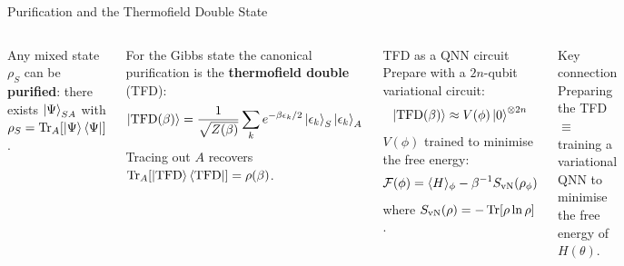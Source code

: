 \documentclass[aspectratio=169,10pt]{beamer}
\begin{document}
\begin{frame}{Purification and the Thermofield Double State}
  \begin{columns}[T]
      Any mixed state $\rho_S$ can be \textbf{purified}: there exists
      $\ket{\Psi}_{SA}$ with $\rho_S = \Tr_A[\ket{\Psi}\bra{\Psi}]$.

      For the Gibbs state the canonical purification is the
      \textbf{thermofield double} (TFD):
      \[
        \ket{\mathrm{TFD}(\beta)}
        = \frac{1}{\sqrt{Z(\beta)}}
          \sum_k e^{-\beta\epsilon_k/2}\ket{\epsilon_k}_S\ket{\epsilon_k}_A
      \]
      Tracing out $A$ recovers
      $\Tr_A[\ket{\mathrm{TFD}}\bra{\mathrm{TFD}}]=\rho(\beta)$.
      \begin{block}{TFD as a QNN circuit}
        Prepare with a $2n$-qubit variational circuit:
        \[
          \ket{\mathrm{TFD}(\beta)} \approx V(\phi)\ket{0}^{\otimes 2n}
        \]
        $V(\phi)$ trained to minimise the free energy:
        \[
          \mathcal{F}(\phi) = \langle H\rangle_\phi
                             - \beta^{-1}S_{\rm vN}(\rho_\phi)
        \]
        where $S_{\rm vN}(\rho)=-\Tr[\rho\ln\rho]$.
      \end{block}
      \vspace{0.1cm}
      \begin{alertblock}{Key connection}
        Preparing the TFD $\equiv$ training a variational QNN
        to minimise the free energy of $H(\theta)$.
      \end{alertblock}
  \end{columns}
\end{frame}
\end{document}
